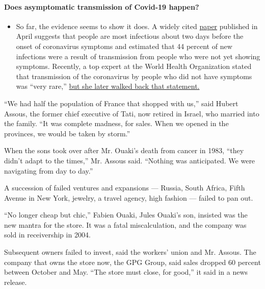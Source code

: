 \begin{itemize}
{  \paragraph{Does asymptomatic transmission of Covid-19
  happen?}\label{does-asymptomatic-transmission-of-covid-19-happen}}

  \begin{itemize}
  \tightlist
  \item
    So far, the evidence seems to show it does. A widely cited
    \href{https://www.nature.com/articles/s41591-020-0869-5}{paper}
    published in April suggests that people are most infectious about
    two days before the onset of coronavirus symptoms and estimated that
    44 percent of new infections were a result of transmission from
    people who were not yet showing symptoms. Recently, a top expert at
    the World Health Organization stated that transmission of the
    coronavirus by people who did not have symptoms was ``very rare,''
    \href{https://www.nytimes.com/2020/06/09/world/coronavirus-updates.html?action=click\&pgtype=Article\&state=default\&region=MAIN_CONTENT_3\&context=storylines_faq\#link-1f302e21}{but
    she later walked back that statement.}
  \end{itemize}
\end{itemize}

``We had half the population of France that shopped with us,'' said
Hubert Assous, the former chief executive of Tati, now retired in
Israel, who married into the family. ``It was complete madness, for
sales. When we opened in the provinces, we would be taken by storm.''

When the sons took over after Mr. Ouaki's death from cancer in 1983,
``they didn't adapt to the times,'' Mr. Assous said. ``Nothing was
anticipated. We were navigating from day to day.''

A succession of failed ventures and expansions --- Russia, South Africa,
Fifth Avenue in New York, jewelry, a travel agency, high fashion ---
failed to pan out.

``No longer cheap but chic,'' Fabien Ouaki, Jules Ouaki's son, insisted
was the new mantra for the store. It was a fatal miscalculation, and the
company was sold in receivership in 2004.

Subsequent owners failed to invest, said the workers' union and Mr.
Assous. The company that owns the store now, the GPG Group, said sales
dropped 60 percent between October and May. ``The store must close, for
good,'' it said in a news release.

